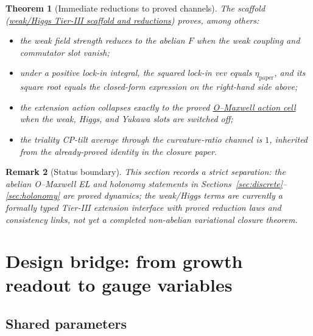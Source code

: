 \documentclass[11pt]{amsart}
\newtheorem{theorem}{Theorem}[section]
\newtheorem{remark}[theorem]{Remark}
\begin{document}
\begin{theorem}[Immediate reductions to proved channels]
\label{thm:weak-higgs-reductions}
The scaffold (\hyperref[lean:weakHiggs-scaffold]{weak/Higgs Tier-III scaffold and reductions}) proves, among others:
\begin{itemize}
\item the weak field strength reduces to the abelian \(F\) when the weak coupling and commutator slot vanish;
\item under a positive lock-in integral, the squared lock-in vev equals \(\eta_{\mathrm{paper}}\), and its square root equals the closed-form expression on the right-hand side above;
\item the extension action collapses exactly to the proved \hyperref[lean:LO-Maxwell]{O--Maxwell action cell} when the weak, Higgs, and Yukawa slots are switched off;
\item the triality CP-tilt average through the curvature-ratio channel is \(1\), inherited from the already-proved identity in the closure paper.
\end{itemize}
\end{theorem}

\begin{remark}[Status boundary]
This section records a strict separation: the abelian O--Maxwell EL and holonomy statements in Sections~\ref{sec:discrete}--\ref{sec:holonomy} are proved dynamics; the weak/Higgs terms are currently a formally typed Tier-III extension interface with proved reduction laws and consistency links, not yet a completed non-abelian variational closure theorem.
\end{remark}

\section{Design bridge: from growth readout to gauge variables}
\label{sec:bridge}

\subsection{Shared parameters}
\end{document}

